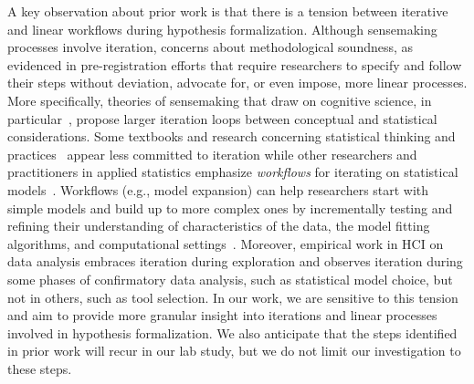 A key observation about prior work is that there is a tension between iterative
and linear workflows during hypothesis formalization. Although sensemaking
processes involve iteration, concerns about methodological soundness, as
evidenced in pre-registration efforts that require researchers to specify and
follow their steps without deviation, advocate for, or even impose, more linear
processes. More specifically, theories of sensemaking that draw on cognitive
science, in particular~\cite{russell1993cost,grolemund2014cognitive}, propose
larger iteration loops between conceptual and statistical considerations. Some
textbooks and research concerning statistical thinking and
practices~\cite{wild1999statisticalThinking,carver2016guidelines} appear less
committed to iteration while other researchers and practitioners in applied
statistics emphasize \textit{workflows} for iterating on statistical
models~\cite{yu2020veridical,lee2019robust,gelman2013bayesianTextbook}.
Workflows (e.g., model expansion) can help researchers start with simple models and build up to more
complex ones by incrementally testing and refining their
understanding of characteristics of the data, the model fitting algorithms, and
computational settings~\cite{betancourt2020bayesianWorkflow,gelman2020bayesianWorkflow,gabry2019visualization}. Moreover, empirical work in HCI on data analysis embraces
iteration during exploration and observes iteration during some phases of
confirmatory data analysis, such as statistical model choice, but not in others,
such as tool selection. In our work, we are sensitive to this tension and aim to
provide more granular insight into iterations and linear processes involved in
hypothesis formalization. We also anticipate that the steps identified in prior
work will recur in our lab study, but we do not limit our investigation to these
steps. 